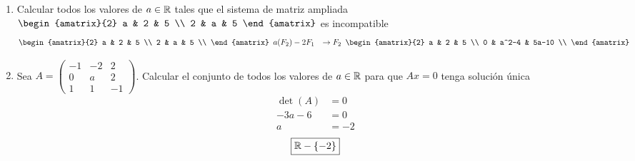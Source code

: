 \documentclass[../practica.root.tex]{subfiles}
\begin{document}
\begin{enumerate}
    \item Calcular todos los valores de $a \in \mathbb{R}$ tales que el sistema de matriz ampliada $\begin{amatrix}{2}
                  a & 2 & 5 \\ 2 & a & 5
              \end{amatrix}$ es incompatible
          \[
              \begin{amatrix}{2}
                  a & 2 & 5 \\
                  2 & a & 5 \\
              \end{amatrix}
              \begin{array}{rl}
                  a(F_2) - 2F_1 & \to F_2
              \end{array}
              \begin{amatrix}{2}
                  a & 2 & 5 \\
                  0 & a^2-4 & 5a-10 \\
              \end{amatrix}
          \]

    \item Sea $A = \begin{pmatrix}
                  -1 & -2 & 2  \\
                  0  & a  & 2  \\
                  1  & 1  & -1
              \end{pmatrix}$. Calcular el conjunto de todos los valores de $a \in \mathbb{R}$ para que $Ax = 0$ tenga solución única %
          \begin{align*}
              \det(A) & = 0  \\
              -3a - 6 & = 0  \\
              a       & = -2
          \end{align*}
          \[
              \boxed{\mathbb{R} - \{-2\}}
          \]


\end{enumerate}
\end{document}
